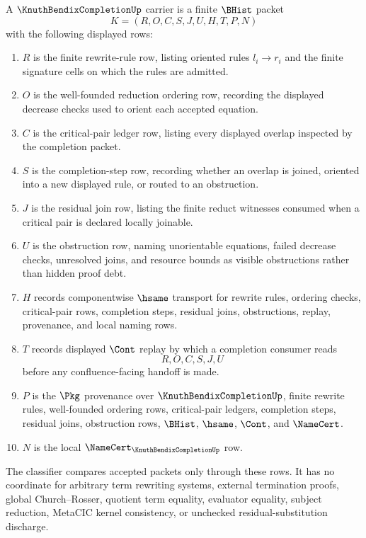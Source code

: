 \begin{definition}
\label{def:knuth-bendix-completion-carrier}
A $\KnuthBendixCompletionUp$ carrier is a finite $\BHist$ packet
$$
K=(R,O,C,S,J,U,H,T,P,N)
$$
with the following displayed rows:
\begin{enumerate}
\item $R$ is the finite rewrite-rule row, listing oriented rules $l_i \to r_i$ and the finite signature cells on which the rules are admitted.
\item $O$ is the well-founded reduction ordering row, recording the displayed decrease checks used to orient each accepted equation.
\item $C$ is the critical-pair ledger row, listing every displayed overlap inspected by the completion packet.
\item $S$ is the completion-step row, recording whether an overlap is joined, oriented into a new displayed rule, or routed to an obstruction.
\item $J$ is the residual join row, listing the finite reduct witnesses consumed when a critical pair is declared locally joinable.
\item $U$ is the obstruction row, naming unorientable equations, failed decrease checks, unresolved joins, and resource bounds as visible obstructions rather than hidden proof debt.
\item $H$ records componentwise $\hsame$ transport for rewrite rules, ordering checks, critical-pair rows, completion steps, residual joins, obstructions, replay, provenance, and local naming rows.
\item $T$ records displayed $\Cont$ replay by which a completion consumer reads
$$
R,O,C,S,J,U
$$
before any confluence-facing handoff is made.
\item $P$ is the $\Pkg$ provenance over $\KnuthBendixCompletionUp$, finite rewrite rules, well-founded ordering rows, critical-pair ledgers, completion steps, residual joins, obstruction rows, $\BHist$, $\hsame$, $\Cont$, and $\NameCert$.
\item $N$ is the local $\NameCert_{\KnuthBendixCompletionUp}$ row.
\end{enumerate}
The classifier compares accepted packets only through these rows. It has no coordinate for arbitrary term rewriting systems, external termination proofs, global Church--Rosser, quotient term equality, evaluator equality, subject reduction, MetaCIC kernel consistency, or unchecked residual-substitution discharge.
\end{definition}

